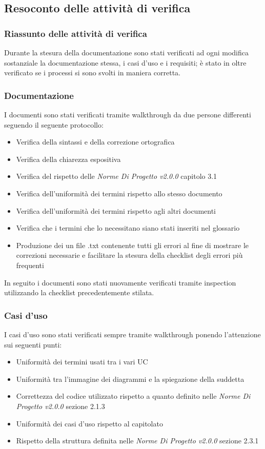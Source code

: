 \documentclass[a4paper]{article}
\begin{document}
				\subsection{Resoconto delle attività di verifica}
				\subsubsection{Riassunto delle attività di verifica}
			Durante la stesura della documentazione sono stati verificati ad ogni modifica sostanziale la documentazione stessa, i
			casi d'uso e i requisiti; è stato in oltre verificato se i processi si sono svolti in maniera corretta.
			\subsubsection{Documentazione}
				I documenti sono stati verificati tramite walkthrough da due persone differenti seguendo il seguente protocollo:
				\begin{itemize}
					\item Verifica della sintassi e della correzione ortografica
					\item Verifica della chiarezza espositiva
					\item Verifica del rispetto delle \emph{Norme Di Progetto v2.0.0} capitolo 3.1
					\item Verifica dell'uniformità dei termini rispetto allo stesso documento
					\item Verifica dell'uniformità dei termini rispetto agli altri documenti
					\item Verifica che i termini che lo necessitano siano stati inseriti nel glossario
					\item Produzione dei un file .txt contenente tutti gli errori al fine di mostrare le correzioni necessarie e
					facilitare la stesura della checklist degli errori più frequenti
				\end{itemize}
				In seguito i documenti sono stati nuovamente verificati tramite inspection utilizzando la checklist precedentemente
				stilata.
			
			\subsubsection{Casi d'uso}
				I casi d'uso sono stati verificati sempre tramite walkthrough ponendo l'attenzione sui seguenti punti:
				\begin{itemize}
					\item Uniformità dei termini usati tra i vari UC
					\item Uniformità tra l'immagine dei diagrammi e la spiegazione della suddetta
					\item Correttezza del codice utilizzato rispetto a quanto definito nelle \emph{Norme Di Progetto v2.0.0} sezione
					2.1.3
					\item Uniformità dei casi d'uso rispetto al capitolato
					\item Rispetto della struttura definita nelle \emph{Norme Di Progetto v2.0.0} sezione 2.3.1
				\end{itemize}
\end{document}
